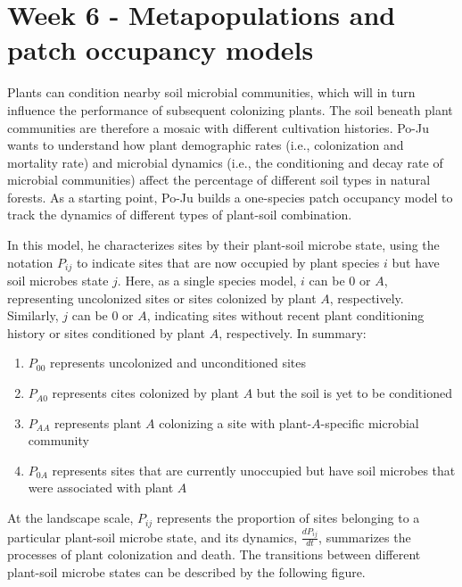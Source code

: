 \documentclass[
]{book}
\providecommand{\tightlist}{%
  \setlength{\itemsep}{0pt}\setlength{\parskip}{0pt}}
\begin{document}
\hypertarget{week-6---metapopulations-and-patch-occupancy-models}{%
\chapter*{Week 6 - Metapopulations and patch occupancy models}\label{week-6---metapopulations-and-patch-occupancy-models}}

Plants can condition nearby soil microbial communities, which will in turn influence the performance of subsequent colonizing plants. The soil beneath plant communities are therefore a mosaic with different cultivation histories. Po-Ju wants to understand how plant demographic rates (i.e., colonization and mortality rate) and microbial dynamics (i.e., the conditioning and decay rate of microbial communities) affect the percentage of different soil types in natural forests. As a starting point, Po-Ju builds a one-species patch occupancy model to track the dynamics of different types of plant-soil combination.

In this model, he characterizes sites by their plant-soil microbe state, using the notation \(P_{ij}\) to indicate sites that are now occupied by plant species \(i\) but have soil microbes state \(j\). Here, as a single species model, \(i\) can be 0 or \(A\), representing uncolonized sites or sites colonized by plant \(A\), respectively. Similarly, \(j\) can be 0 or \(A\), indicating sites without recent plant conditioning history or sites conditioned by plant \(A\), respectively. In summary:

\begin{enumerate}
\def\labelenumi{\arabic{enumi}.}
\tightlist
\item
  \(P_{00}\) represents uncolonized and unconditioned sites
\item
  \(P_{A0}\) represents cites colonized by plant \(A\) but the soil is yet to be conditioned
\item
  \(P_{AA}\) represents plant \(A\) colonizing a site with plant-\(A\)-specific microbial community
\item
  \(P_{0A}\) represents sites that are currently unoccupied but have soil microbes that were associated with plant \(A\)
\end{enumerate}

At the landscape scale, \(P_{ij}\) represents the proportion of sites belonging to a particular plant-soil microbe state, and its dynamics, \(\frac {dP_{ij}}{dt}\), summarizes the processes of plant colonization and death. The transitions between different plant-soil microbe states can be described by the following figure.
\end{document}

